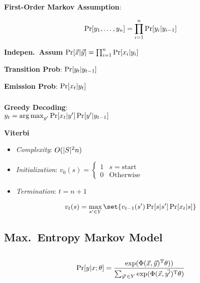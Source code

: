 \documentclass[9pt]{extarticle}
\renewcommand{\green}[1]{{\color{ForestGreen} #1}}
\begin{document}
\begin{multicols}{3}
  \textbf{\green{First-Order Markov Assumption}}:

  \begin{equation*}
    \Pr\lbrack y_{1},\ldots,y_{n}\rbrack = \prod_{i=1}^{n} \Pr[y_{i} \vert y_{i-1}]
  \end{equation*}

  \textbf{\green{Indepen.\ Assum}} $\Pr\lbrack\vec{x} \vert \vec{y}\rbrack = \prod_{i=1}^{n} \Pr[x_{i} \vert y_{i}]$

  \textbf{\green{Transition Prob}}: $\Pr\lbrack y_{t} \vert y_{t-1}\rbrack$

  \textbf{\green{Emission Prob}}: $\Pr\lbrack x_{t} \vert y_{t}\rbrack$

  \subsubsection*{}

  \textbf{\green{Greedy Decoding}}: \\${y_t = \operatorname*{arg\,max}_{y'} \Pr[x_t \vert y'] \Pr[y' \vert y_{t-1}]}$

  \textbf{\green{Viterbi}}
  \begin{itemize}
    \item \textit{Complexity}: $O(\lvert S\rvert^{2} n)$
    \item \textit{Initialization}: $v_0(s) = \begin{cases}
                                               1 & s = \text{start} \\
                                               0 & \text{Otherwise}
                                             \end{cases}$
    \item \textit{Termination}: $t = n+1$
  \end{itemize}

  \begin{equation*}
    v_{t}(s) = \max_{s' \in Y}\set{v_{t-1}(s') \Pr[s \vert s'] \Pr[x_t \vert s]}
  \end{equation*}

  \subsection*{Max.\ Entropy Markov Model}
  \subsection*{}

  \begin{equation*}
    \Pr[y\vert x ; \theta] = \frac{\exp(\Phi(\vec{x},\vec{y})^{\text{T}}\theta))}{\sum_{\vec{y}' \in Y} \exp(\Phi(\vec{x}, \vec{y'})^{\text{T}}\theta)}
  \end{equation*}


\end{multicols}
\end{document}
